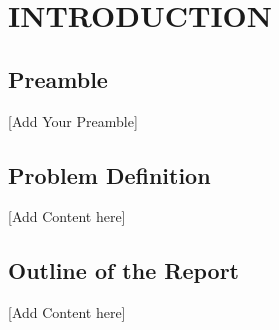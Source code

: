 \chapter{\texorpdfstring{\centering \textbf{\MakeUppercase{INTRODUCTION}}}{INTRODUCTION}}
\justifying
\section{Preamble}
[Add Your Preamble]

\section{Problem Definition}
[Add Content here]

\section{Outline of the Report}
[Add Content here]